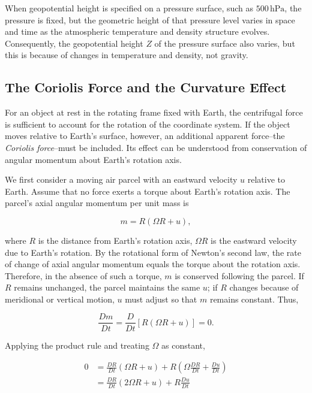 \documentclass[10pt,twocolumn]{memoir}
\begin{document}
When geopotential height is specified on a pressure surface, such as $500\,\mathrm{hPa}$, the pressure is fixed, but the geometric height of that pressure level varies in space and time as the atmospheric temperature and density structure evolves. Consequently, the geopotential height $Z$ of the pressure surface also varies, but this is because of changes in temperature and density, not gravity.

\subsection{The Coriolis Force and the Curvature Effect}

For an object at rest in the rotating frame fixed with Earth, the centrifugal force is sufficient to account for the rotation of the coordinate system. If the object moves relative to Earth's surface, however, an additional apparent force--the \textit{Coriolis force}--must be included. Its effect can be understood from conservation of angular momentum about Earth's rotation axis.

We first consider a moving air parcel with an eastward velocity $u$ relative to Earth. Assume that no force exerts a torque about Earth's rotation axis. The parcel's axial angular momentum per unit mass is

\begin{equation}
    m = R(\Omega R + u),
\end{equation}

where $R$ is the distance from Earth's rotation axis, $\Omega R$ is the eastward velocity due to Earth's rotation. By the rotational form of Newton's second law, the rate of change of axial angular momentum equals the torque about the rotation axis. Therefore, in the absence of such a torque, $m$ is conserved following the parcel. If $R$ remains unchanged, the parcel maintains the same $u$; if $R$ changes because of meridional or vertical motion, $u$ must adjust so that $m$ remains constant. Thus,

\begin{equation}
    \frac{Dm}{Dt} = \frac{D}{Dt}\left[R(\Omega R+u)\right] = 0.
\end{equation}

Applying the product rule and treating $\Omega$ as constant,

\begin{equation}
\begin{aligned}
    0
    &= \frac{DR}{Dt}(\Omega R+u) + R\left(\Omega\frac{DR}{Dt}+\frac{Du}{Dt}\right) \\
    &= \frac{DR}{Dt}(2\Omega R+u) + R\frac{Du}{Dt}
\end{aligned}
\end{equation}
\end{document}
